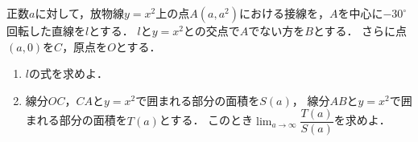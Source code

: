 \documentclass[../../main.tex]{subfiles}
\begin{document}
正数$a$に対して，放物線$y=x^2$上の点$A(a,a^2)$における接線を，$A$を中心に$-30^\circ$回転した直線を$l$とする．
$l$と$y=x^2$との交点で$A$でない方を$B$とする．
さらに点$(a,0)$を$C$，原点を$O$とする．
\begin{enumerate}
  \item $l$の式を求めよ．
  \item 線分$OC$，$CA$と$y=x^2$で囲まれる部分の面積を$S(a)$，
    線分$AB$と$y=x^2$で囲まれる部分の面積を$T(a)$とする．
    このとき$\displaystyle\lim_{a\to\infty}\dfrac{T(a)}{S(a)}$を求めよ．
\end{enumerate}
\end{document}
